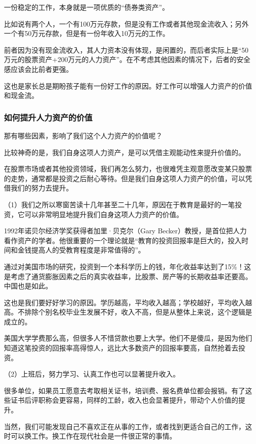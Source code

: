 一份稳定的工作，本身就是一项优质的“债券类资产”。

比如说有两个人，一个有100万元存款，但是没有工作或者其他现金流收入；另外一个有50万元存款，但是有一份年收入10万元的工作。

前者因为没有现金流收入，其人力资本没有体现，是闲置的，而后者实际上是“50万元的股票资产+200万元的人力资产”。在不考虑其他因素的情况下，后者的安全感应该会比前者更强。

这也是家长总是期盼孩子能有一份好工作的原因。好工作可以增强人力资产的价值和现金流。

\subsubsection{如何提升人力资产的价值}

那有哪些因素，影响了我们这个人力资产的价值呢？

比较神奇的是，我们自身这项人力资产，是可以凭借主观能动性来提升价值的。

在股票市场或者其他投资领域，我们再怎么努力，也很难凭主观意愿改变某只股票的走势，通常都是投资之后耐心等待。但是我们自身这项人力资产的价值，可以凭借我们的努力去提升。

（1）我们之所以寒窗苦读十几年甚至二十几年，原因在于教育是最好的一笔投资，它可以非常明显地提升我们自身这项人力资产的价值。

1992年诺贝尔经济学奖获得者加里·贝克尔（Gary Becker）教授，是首位把人力看作资产的学者。他很重要的一个理论就是“教育的投资回报率是巨大的，投入时间和金钱提高人的受教育程度是非常值得的”。

通过对美国市场的研究，投资到一个本科学历上的钱，年化收益率达到了15\%！这是考虑了通货膨胀因素之后的真实收益率，比股票、房产等的长期收益率还要高。中国也是如此。

这也是我们要好好学习的原因。学历越高，平均收入越高；学校越好，平均收入越高。不排除个别名校毕业生发展不好，收入不高，但是从整体上来说，这个逻辑是成立的。

美国大学学费那么高，但很多人不惜贷款也要上大学。他们不是傻瓜，是因为他们知道这笔投资的回报率高得惊人，远比大多数资产的回报率要高，自然抢着去投资。

（2）上班后，努力学习、认真工作也可以显著提升收入。

很多单位，如果员工愿意去考取相关证书，培训费、报名费单位都会报销。有了这些证书后评职称会更容易，同样的工龄，收入也会显著提升，带动个人价值的提升。

当然，我们可能发现自己不喜欢正在从事的工作，或者找到更适合自己的工作，这时可以换工作。换工作在现代社会是一件很正常的事情。

